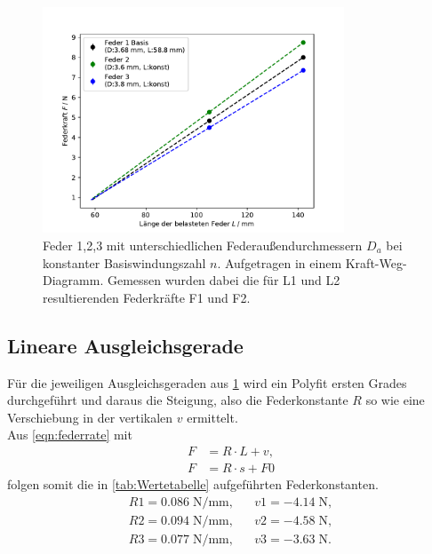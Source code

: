 \begin{figure}[H]
    \center
    \includegraphics[width=0.8\textwidth]{plots/D_kraftweg_dia.pdf}
    \caption{Feder 1,2,3 mit unterschiedlichen Federaußendurchmessern $D_a$ bei konstanter Basiswindungszahl $n$.
    Aufgetragen in einem Kraft-Weg-Diagramm. Gemessen wurden dabei
    die für L1 und L2 resultierenden Federkräfte F1 und F2.}
    \label{tab:LF_D}
\end{figure}
\subsection{Lineare Ausgleichsgerade}
\label{sec:fit}
Für die jeweiligen Ausgleichsgeraden aus \ref{tab:LF_D} wird ein Polyfit \cite{numpy_polyfit}
ersten Grades durchgeführt und daraus die Steigung, also die Federkonstante $R$ so wie eine Verschiebung
in der vertikalen $v$ ermittelt.\\
Aus \ref{eqn:federrate} mit
\begin{align*}
  F&=R \cdot L + v ,\\
  F&=R \cdot s + F0
\end{align*}
folgen somit die in \ref{tab:Wertetabelle} aufgeführten Federkonstanten.
\begin{align*}
  R1= 0.086\;\si{\N\per\mm}, &&  v1= -4.14\;\si{\N},\\
  R2= 0.094\;\si{\N\per\mm}, &&  v2= -4.58\;\si{\N},\\
  R3= 0.077\;\si{\N\per\mm}, &&  v3= -3.63\;\si{\N}.\\
\end{align*}

